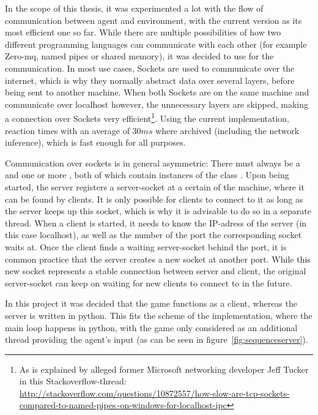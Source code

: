 In the scope of this thesis, it was experimented a lot with the flow of communication between agent and environment, with the current version as its most efficient one so far. While there are multiple possibilities of how two different programming languages can communicate with each other (for example Zero-mq, named pipes or shared memory), it was decided to use  for the communication. In most use cases, Sockets are used to communicate over the internet, which is why they normally abstract data over several layers, before being sent to another machine. When both Sockets are on the same machine and communicate over localhost however, the unnecessary layers are skipped, making a connection over Sockets very efficient\footnote{As is explained by alleged former Microsoft networking developer Jeff Tucker in this Stackoverflow-thread: \href{http://stackoverflow.com/questions/10872557/how-slow-are-tcp-sockets-compared-to-named-pipes-on-windows-for-localhost-ipc}{http://stackoverflow.com/questions/10872557/how-slow-are-tcp-sockets-compared-to-named-pipes\,-on-windows-for-localhost-ipc}}. Using the current implementation, reaction times with an average of $30ms$ where archived (including the network inference), which is fast enough for all purposes.

Communication over sockets is in general asymmetric: There must always be a  and one or more , both of which contain instances of the class . Upon being started, the server registers a server-socket at a certain  of the machine, where it can be found by clients. It is only possible for clients to connect to it as long as the server keeps up this socket, which is why it is advisable to do so in a separate thread. When a client is started, it needs to know the IP-adress of the server (in this case localhost), as well as the number of the port the corresponding socket waits at. Once the client finds a waiting server-socket behind the port, it is common practice that the server creates a new socket at another port. While this new socket represents a stable connection between server and client, the original server-socket can keep on waiting for new clients to connect to in the future.

In this project it was decided that the game functions as a client, whereas the server is written in python. This fits the scheme of the implementation, where the main loop happens in python, with the game only considered as an additional thread providing the agent's input (as can be seen in figure~\ref{fig:sequenceserver}).


